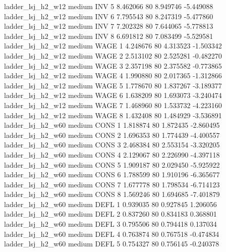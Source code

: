   ladder_lsj_h2_w12     medium      INV                 5  8.462066 80       8.949746          -5.449088
  ladder_lsj_h2_w12     medium      INV                 6  7.795543 80       8.247319          -5.477860
  ladder_lsj_h2_w12     medium      INV                 7  7.202328 80       7.644065          -5.778813
  ladder_lsj_h2_w12     medium      INV                 8  6.691812 80       7.083499          -5.529581
  ladder_lsj_h2_w12     medium     WAGE                 1  4.248676 80       4.313523          -1.503342
  ladder_lsj_h2_w12     medium     WAGE                 2  2.513102 80       2.525281          -0.482270
  ladder_lsj_h2_w12     medium     WAGE                 3  2.357198 80       2.375582          -0.773865
  ladder_lsj_h2_w12     medium     WAGE                 4  1.990880 80       2.017365          -1.312866
  ladder_lsj_h2_w12     medium     WAGE                 5  1.778670 80       1.837267          -3.189377
  ladder_lsj_h2_w12     medium     WAGE                 6  1.638209 80       1.693073          -3.240474
  ladder_lsj_h2_w12     medium     WAGE                 7  1.468960 80       1.533732          -4.223160
  ladder_lsj_h2_w12     medium     WAGE                 8  1.432408 80       1.484929          -3.536891
  ladder_lsj_h2_w60     medium     CONS                 1  1.818874 80       1.872435          -2.860495
  ladder_lsj_h2_w60     medium     CONS                 2  1.696353 80       1.774439          -4.400557
  ladder_lsj_h2_w60     medium     CONS                 3  2.468384 80       2.553154          -3.320205
  ladder_lsj_h2_w60     medium     CONS                 4  2.129067 80       2.226990          -4.397118
  ladder_lsj_h2_w60     medium     CONS                 5  1.909187 80       2.029450          -5.925922
  ladder_lsj_h2_w60     medium     CONS                 6  1.788599 80       1.910196          -6.365677
  ladder_lsj_h2_w60     medium     CONS                 7  1.677778 80       1.798534          -6.714123
  ladder_lsj_h2_w60     medium     CONS                 8  1.569246 80       1.694685          -7.401879
  ladder_lsj_h2_w60     medium     DEFL                 1  0.939035 80       0.927845           1.206056
  ladder_lsj_h2_w60     medium     DEFL                 2  0.837260 80       0.834183           0.368801
  ladder_lsj_h2_w60     medium     DEFL                 3  0.795506 80       0.794418           0.137034
  ladder_lsj_h2_w60     medium     DEFL                 4  0.763874 80       0.767518          -0.474834
  ladder_lsj_h2_w60     medium     DEFL                 5  0.754327 80       0.756145          -0.240378
